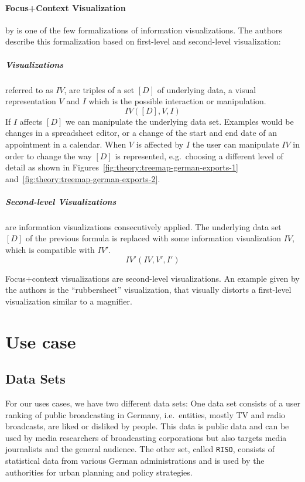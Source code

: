 \documentclass{article}
\newcommand{\riso}{\texttt{RISO}}
\begin{document}
\paragraph{Focus+Context Visualization} by \textcite{Bjork1999} is one of the few formalizations of information visualizations.
The authors describe this formalization based on first-level and second-level visualization:
\subparagraph{Visualizations} referred to as $IV$, are triples of a set $[D]$ of underlying data, a visual representation $V$ and $I$ which is the possible interaction or manipulation.
\begin{equation}
  IV([D], V, I)
\end{equation}
If $I$ affects $[D]$ we can manipulate the underlying data set.
Examples would be changes in a spreadsheet editor, or a change of the start and end date of an appointment in a calendar.
When $V$ is affected by $I$ the user can manipulate $IV$ in order to change the way $[D]$ is represented, e.g.\ choosing a different level of detail as shown in Figures~\ref{fig:theory:treemap-german-exports-1} and~\ref{fig:theory:treemap-german-exports-2}.

\subparagraph{Second-level Visualizations} are information visualizations consecutively applied.
The underlying data set $[D]$ of the previous formula is replaced with some information visualization $IV$, which is compatible with $IV'$.
\begin{equation}
  IV'(IV, V', I')
\end{equation}


Focus+context visualizations are second-level visualizations.
An example given by the authors is the  ``rubbersheet'' visualization, that visually distorts a first-level visualization similar to a magnifier.




\clearpage
\section{Use case}\label{sec:use-case}

\subsection{Data Sets}
For our uses cases, we have two different data sets:
One data set consists of a user ranking of public broadcasting in Germany, i.e.\ entities, mostly TV and radio broadcasts, are liked or disliked by people.
This data is public data and can be used by media researchers of broadcasting corporations but also targets media journalists and the general audience.
The other set, called \riso{}, consists of statistical data from various German administrations and is used by the authorities for urban planning and policy strategies.
\end{document}
